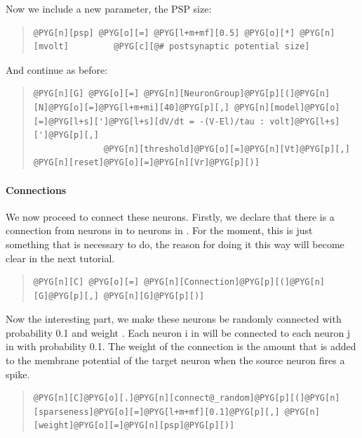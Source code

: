 \documentclass[letterpaper,10pt,english]{manual}
\begin{document}
Now we include a new parameter, the PSP size:
\begin{quote}

\begin{Verbatim}[commandchars=@\[\]]
@PYG[n][psp] @PYG[o][=] @PYG[l+m+mf][0.5] @PYG[o][*] @PYG[n][mvolt]         @PYG[c][@# postsynaptic potential size]
\end{Verbatim}
\end{quote}

And continue as before:
\begin{quote}

\begin{Verbatim}[commandchars=@\[\]]
@PYG[n][G] @PYG[o][=] @PYG[n][NeuronGroup]@PYG[p][(]@PYG[n][N]@PYG[o][=]@PYG[l+m+mi][40]@PYG[p][,] @PYG[n][model]@PYG[o][=]@PYG[l+s][']@PYG[l+s][dV/dt = -(V-El)/tau : volt]@PYG[l+s][']@PYG[p][,]
              @PYG[n][threshold]@PYG[o][=]@PYG[n][Vt]@PYG[p][,] @PYG[n][reset]@PYG[o][=]@PYG[n][Vr]@PYG[p][)]
\end{Verbatim}
\end{quote}


\paragraph{Connections}

We now proceed to connect these neurons. Firstly, we declare
that there is a connection from neurons in  to neurons in .
For the moment, this is just something that is necessary to
do, the reason for doing it this way will become clear in the
next tutorial.
\begin{quote}

\begin{Verbatim}[commandchars=@\[\]]
@PYG[n][C] @PYG[o][=] @PYG[n][Connection]@PYG[p][(]@PYG[n][G]@PYG[p][,] @PYG[n][G]@PYG[p][)]
\end{Verbatim}
\end{quote}

Now the interesting part, we make these neurons be randomly
connected with probability 0.1 and weight . Each neuron
i in  will be connected to each neuron j in 
with probability 0.1. The weight of the connection is the
amount that is added to the membrane potential of the target
neuron when the source neuron fires a spike.
\begin{quote}

\begin{Verbatim}[commandchars=@\[\]]
@PYG[n][C]@PYG[o][.]@PYG[n][connect@_random]@PYG[p][(]@PYG[n][sparseness]@PYG[o][=]@PYG[l+m+mf][0.1]@PYG[p][,] @PYG[n][weight]@PYG[o][=]@PYG[n][psp]@PYG[p][)]
\end{Verbatim}
\end{quote}
\end{document}
